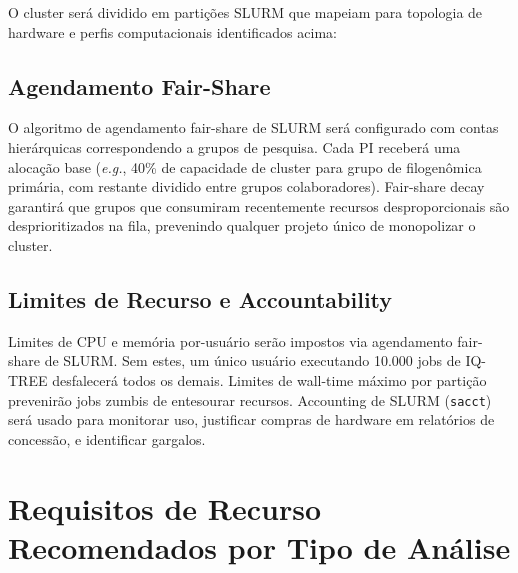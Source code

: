 O cluster será dividido em partições SLURM que mapeiam para topologia de hardware e perfis computacionais identificados acima:

\begin{table}[htbp]
\centering
\caption{Partições SLURM Recomendadas}
\end{table}

\subsection{Agendamento Fair-Share}

O algoritmo de agendamento fair-share de SLURM será configurado com contas hierárquicas correspondendo a grupos de pesquisa. Cada PI receberá uma alocação base (\textit{e.g.}, 40\% de capacidade de cluster para grupo de filogenômica primária, com restante dividido entre grupos colaboradores). Fair-share decay garantirá que grupos que consumiram recentemente recursos desproporcionais são desprioritizados na fila, prevenindo qualquer projeto único de monopolizar o cluster.

\subsection{Limites de Recurso e Accountability}

Limites de CPU e memória por-usuário serão impostos via agendamento fair-share de SLURM. Sem estes, um único usuário executando 10.000 jobs de IQ-TREE desfalecerá todos os demais. Limites de wall-time máximo por partição prevenirão jobs zumbis de entesourar recursos. Accounting de SLURM (\texttt{sacct}) será usado para monitorar uso, justificar compras de hardware em relatórios de concessão, e identificar gargalos.

\section{Requisitos de Recurso Recomendados por Tipo de Análise}

